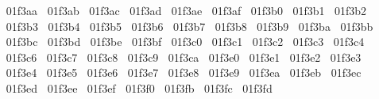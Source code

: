 {  ^^^^^^01f3aa%
  ^^^^^^01f3ab%
  ^^^^^^01f3ac%
  ^^^^^^01f3ad%
  ^^^^^^01f3ae%
  ^^^^^^01f3af%
  ^^^^^^01f3b0%
  ^^^^^^01f3b1%
  ^^^^^^01f3b2%
  ^^^^^^01f3b3%
  ^^^^^^01f3b4%
  ^^^^^^01f3b5%
  ^^^^^^01f3b6%
  ^^^^^^01f3b7%
  ^^^^^^01f3b8%
  ^^^^^^01f3b9%
  ^^^^^^01f3ba%
  ^^^^^^01f3bb%
  ^^^^^^01f3bc%
  ^^^^^^01f3bd%
  ^^^^^^01f3be%
  ^^^^^^01f3bf%
  ^^^^^^01f3c0%
  ^^^^^^01f3c1%
  ^^^^^^01f3c2%
  ^^^^^^01f3c3%
  ^^^^^^01f3c4%
  ^^^^^^01f3c6%
  ^^^^^^01f3c7%
  ^^^^^^01f3c8%
  ^^^^^^01f3c9%
  ^^^^^^01f3ca%
  ^^^^^^01f3e0%
  ^^^^^^01f3e1%
  ^^^^^^01f3e2%
  ^^^^^^01f3e3%
  ^^^^^^01f3e4%
  ^^^^^^01f3e5%
  ^^^^^^01f3e6%
  ^^^^^^01f3e7%
  ^^^^^^01f3e8%
  ^^^^^^01f3e9%
  ^^^^^^01f3ea%
  ^^^^^^01f3eb%
  ^^^^^^01f3ec%
  ^^^^^^01f3ed%
  ^^^^^^01f3ee%
  ^^^^^^01f3ef%
  ^^^^^^01f3f0%
  ^^^^^^01f3fb%
  ^^^^^^01f3fc%
  ^^^^^^01f3fd%
}
